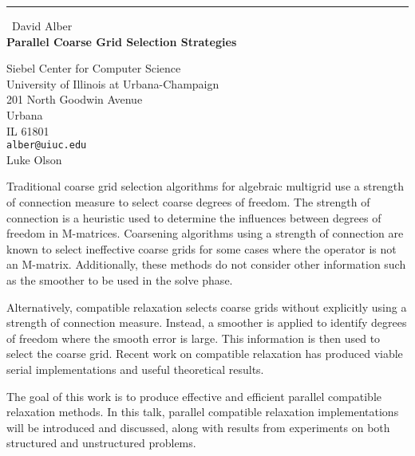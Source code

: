 \documentclass{report}
\begin{document}
\begin{center}
\rule{6in}{1pt} \
{\large David Alber \\
{\bf Parallel Coarse Grid Selection Strategies}}

Siebel Center for Computer Science \\ University of Illinois at Urbana-Champaign \\ 201 North Goodwin Avenue \\ Urbana \\ IL 61801
\\
{\tt alber@uiuc.edu}\\
Luke Olson\end{center}

Traditional coarse grid selection algorithms for algebraic multigrid use
a strength of connection measure to select coarse degrees of freedom. The
strength of connection is a heuristic used to determine the influences
between degrees of freedom in M-matrices. Coarsening algorithms using a
strength of connection are known to select ineffective coarse grids for
some cases where the operator is not an M-matrix. Additionally, these
methods do not consider other information such as the smoother to be used
in the solve phase.

Alternatively, compatible relaxation selects coarse grids without
explicitly using a strength of connection measure. Instead, a smoother is
applied to identify degrees of freedom where the smooth error is large.
This information is then used to select the coarse grid. Recent work on
compatible relaxation has produced viable serial implementations and
useful theoretical results.

The goal of this work is to produce effective and efficient parallel
compatible relaxation methods. In this talk, parallel compatible
relaxation implementations will be introduced and discussed, along with
results from experiments on both structured and unstructured problems.
\end{document}
